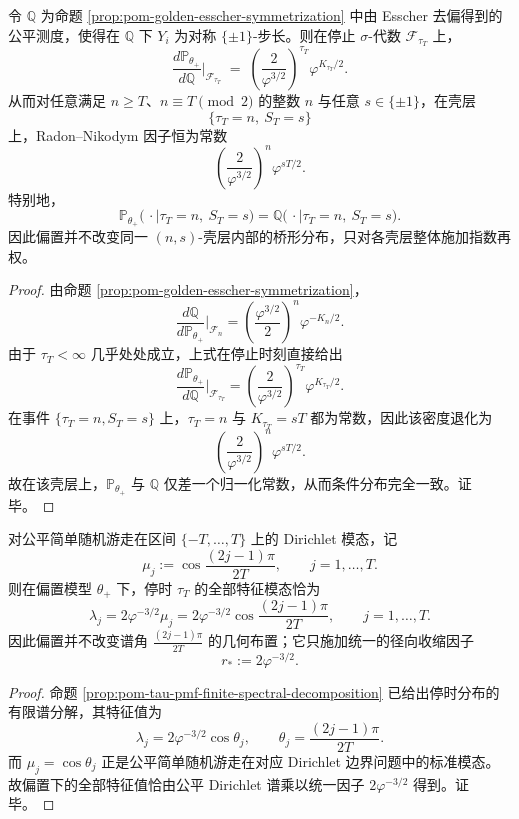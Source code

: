 \begin{theorem}\label{thm:conclusion-golden-sprt-esscher-shell-rigidity}
令 \(\mathbb Q\) 为命题 \ref{prop:pom-golden-esscher-symmetrization} 中由 Esscher 去偏得到的公平测度，使得在 \(\mathbb Q\) 下 \(Y_i\) 为对称 \(\{\pm 1\}\)-步长。则在停止 \(\sigma\)-代数 \(\mathcal F_{\tau_T}\) 上，
\[
\boxed{\;
\frac{d\mathbb P_{\theta_+}}{d\mathbb Q}
\Big|_{\mathcal F_{\tau_T}}
\;=\;
\left(\frac{2}{\varphi^{3/2}}\right)^{\tau_T}\varphi^{K_{\tau_T}/2}.
\;}
\]
从而对任意满足 \(n\ge T\)、\(n\equiv T\pmod 2\) 的整数 \(n\) 与任意 \(s\in\{\pm1\}\)，在壳层
\[
\{\tau_T=n,\ S_T=s\}
\]
上，Radon--Nikodym 因子恒为常数
\[
\left(\frac{2}{\varphi^{3/2}}\right)^n\varphi^{sT/2}.
\]
特别地，
\[
\boxed{\;
\mathbb P_{\theta_+}\bigl(\,\cdot\mid \tau_T=n,\ S_T=s\bigr)
=
\mathbb Q\bigl(\,\cdot\mid \tau_T=n,\ S_T=s\bigr).
\;}
\]
因此偏置并不改变同一 \((n,s)\)-壳层内部的桥形分布，只对各壳层整体施加指数再权。
\end{theorem}
\begin{proof}
由命题 \ref{prop:pom-golden-esscher-symmetrization}，
\[
\frac{d\mathbb Q}{d\mathbb P_{\theta_+}}\Big|_{\mathcal F_n}
=
\left(\frac{\varphi^{3/2}}{2}\right)^n\varphi^{-K_n/2}.
\]
由于 \(\tau_T<\infty\) 几乎处处成立，上式在停止时刻直接给出
\[
\frac{d\mathbb P_{\theta_+}}{d\mathbb Q}\Big|_{\mathcal F_{\tau_T}}
=
\left(\frac{2}{\varphi^{3/2}}\right)^{\tau_T}\varphi^{K_{\tau_T}/2}.
\]
在事件 \(\{\tau_T=n,S_T=s\}\) 上，\(\tau_T=n\) 与 \(K_{\tau_T}=sT\) 都为常数，因此该密度退化为
\[
\left(\frac{2}{\varphi^{3/2}}\right)^n\varphi^{sT/2}.
\]
故在该壳层上，\(\mathbb P_{\theta_+}\) 与 \(\mathbb Q\) 仅差一个归一化常数，从而条件分布完全一致。证毕。
\end{proof}

\begin{corollary}\label{cor:conclusion-golden-sprt-stopping-spectrum-radial-contraction}
对公平简单随机游走在区间 \(\{-T,\dots,T\}\) 上的 Dirichlet 模态，记
\[
\mu_j:=\cos\frac{(2j-1)\pi}{2T},
\qquad
j=1,\dots,T.
\]
则在偏置模型 \(\theta_+\) 下，停时 \(\tau_T\) 的全部特征模态恰为
\[
\boxed{\;
\lambda_j
=
2\varphi^{-3/2}\mu_j
=
2\varphi^{-3/2}\cos\frac{(2j-1)\pi}{2T},
\qquad
j=1,\dots,T.
\;}
\]
因此偏置并不改变谱角
\(
\frac{(2j-1)\pi}{2T}
\)
的几何布置；它只施加统一的径向收缩因子
\[
\boxed{\;r_\ast:=2\varphi^{-3/2}.\;}
\]
\end{corollary}
\begin{proof}
命题 \ref{prop:pom-tau-pmf-finite-spectral-decomposition} 已给出停时分布的有限谱分解，其特征值为
\[
\lambda_j=2\varphi^{-3/2}\cos\theta_j,
\qquad
\theta_j=\frac{(2j-1)\pi}{2T}.
\]
而 \(\mu_j=\cos\theta_j\) 正是公平简单随机游走在对应 Dirichlet 边界问题中的标准模态。故偏置下的全部特征值恰由公平 Dirichlet 谱乘以统一因子 \(2\varphi^{-3/2}\) 得到。证毕。
\end{proof}

